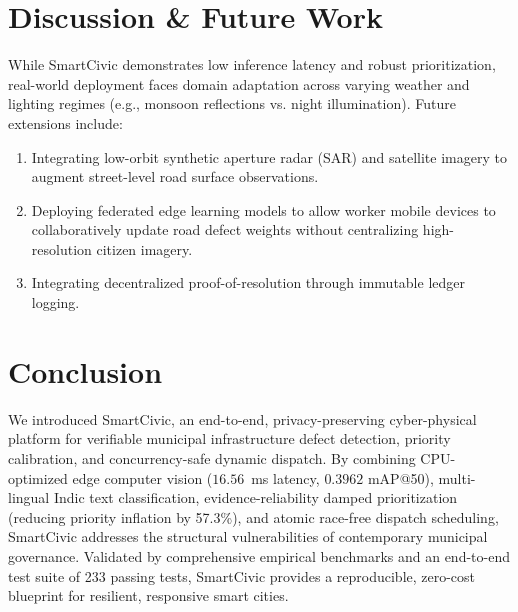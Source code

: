 \documentclass[conference]{IEEEtran}
\begin{document}
\section{Discussion \& Future Work}
\label{sec:discussion}
While SmartCivic demonstrates low inference latency and robust prioritization, real-world deployment faces domain adaptation across varying weather and lighting regimes (e.g., monsoon reflections vs. night illumination). Future extensions include:
\begin{enumerate}
    \item Integrating low-orbit synthetic aperture radar (SAR) and satellite imagery to augment street-level road surface observations.
    \item Deploying federated edge learning models to allow worker mobile devices to collaboratively update road defect weights without centralizing high-resolution citizen imagery.
    \item Integrating decentralized proof-of-resolution through immutable ledger logging.
\end{enumerate}

\section{Conclusion}
\label{sec:conclusion}
We introduced SmartCivic, an end-to-end, privacy-preserving cyber-physical platform for verifiable municipal infrastructure defect detection, priority calibration, and concurrency-safe dynamic dispatch. By combining CPU-optimized edge computer vision ($16.56$~ms latency, $0.3962$ mAP@50), multi-lingual Indic text classification, evidence-reliability damped prioritization (reducing priority inflation by 57.3\%), and atomic race-free dispatch scheduling, SmartCivic addresses the structural vulnerabilities of contemporary municipal governance. Validated by comprehensive empirical benchmarks and an end-to-end test suite of 233 passing tests, SmartCivic provides a reproducible, zero-cost blueprint for resilient, responsive smart cities.
\end{document}
